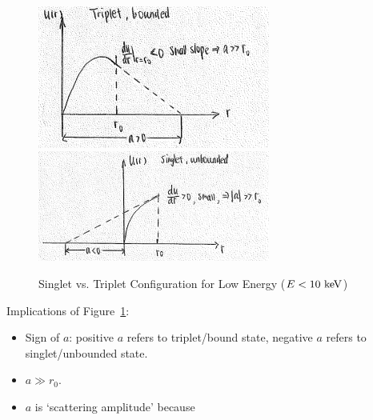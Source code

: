 \documentclass{school-22.101-notes}
\begin{document}
\begin{enumerate}
\begin{figure}
    \includegraphics[width=3in]{images/scattering/s-wave-triplet.png}
    \includegraphics[width=3in]{images/scattering/s-wave-singlet.png}    
    \caption{Singlet vs. Triplet Configuration for Low Energy ($E<10 \mbox{ } \mathrm{keV}$)\label{scattering-s-wave}}
\end{figure}
Implications of Figure~\ref{scattering-s-wave}:
\begin{itemize}
\item Sign of $a$:  positive $a$ refers to triplet/bound state, negative $a$ refers to singlet/unbounded state. 
\item $a \gg r_0$. 
\item $a$ is `scattering amplitude' because 
\end{itemize}
\end{enumerate}
\end{document}
